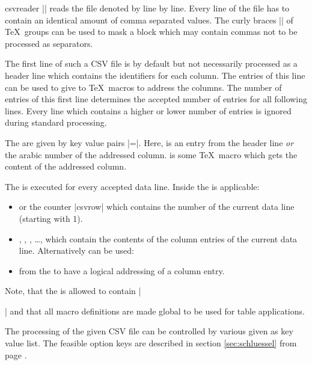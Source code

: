 \documentclass[a4paper,11pt]{ltxdoc}
\begin{document}
\begin{docCommand}{csvreader}{}
  |\csvreader| reads the file denoted by  line by line.
  Every line of the file has to contain an identical amount of
  comma separated values. The curly braces |{}| of \TeX\ groups can be used
  to mask a block which may contain commas not to be processed as separators.\smallskip

  The first line of such a CSV file is by default but not necessarily
  processed as a header line which contains the identifiers for each column.
  The entries of this line can be used to give  to \TeX\ macros
  to address the columns. The number of entries of this first line
  determines the accepted number of entries for all following lines.
  Every line which contains a higher or lower number of entries is ignored
  during standard processing.\smallskip

  The  are given by key value pairs
  \mbox{|=|}. Here,  is an entry from the
  header line \emph{or} the arabic number of the addressed column.
   is some \TeX\ macro which gets the content of the addressed column.\smallskip

  The  is executed for every accepted data line. Inside the
   is applicable:
  \begin{itemize}
  \item {} or the counter |csvrow| which contains the number of the
    current data line (starting with 1).
  \item {}, , , \ldots,
    which contain the contents of the column entries of the current data line.
    Alternatively can be used:
  \item {} from the  to have a logical
    addressing of a column entry.
  \end{itemize}
  Note, that the  is allowed to contain |\par| and
  that all macro definitions are made global to be used for table applications.\smallskip

  The processing of the given CSV file can be controlled by various
   given as key value list. The feasible option keys
  are described in section \ref{sec:schluessel} from page \pageref{sec:schluessel}.


\end{docCommand}
\end{document}

